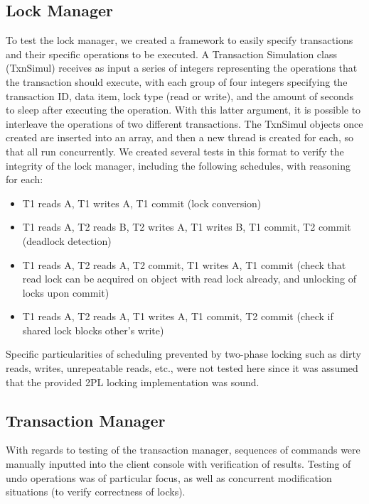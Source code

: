 \documentclass[11pt]{article}
\begin{document}
\subsection*{Lock Manager}

To test the lock manager, we created a framework to easily specify transactions and their specific operations to be executed. A Transaction Simulation class (TxnSimul) receives as input a series of integers representing the operations that the transaction should execute, with each group of four integers specifying the transaction ID, data item, lock type (read or write), and the amount of seconds to sleep after executing the operation. With this latter argument, it is possible to interleave the operations of two different transactions. The TxnSimul objects once created are inserted into an array, and then a new thread is created for each, so that all run concurrently. We created several tests in this format to verify the integrity of the lock manager, including the following schedules, with reasoning for each:

\begin{itemize}
\item T1 reads A, T1 writes A, T1 commit (lock conversion)
\item T1 reads A, T2 reads B, T2 writes A, T1 writes B, T1 commit, T2 commit (deadlock detection)
\item T1 reads A, T2 reads A, T2 commit, T1 writes A, T1 commit (check that read lock can be acquired on object with read lock already, and unlocking of locks upon commit)
\item T1 reads A, T2 reads A, T1 writes A, T1 commit, T2 commit (check if shared lock blocks other's write)
\end{itemize}

Specific particularities of scheduling prevented by two-phase locking such as dirty reads, writes, unrepeatable reads, etc., were not tested here since it was assumed that the provided 2PL locking implementation was sound. \par

\subsection*{Transaction Manager}

With regards to testing of the transaction manager, sequences of commands were manually inputted into the client console with verification of results. Testing of undo operations was of particular focus, as well as concurrent modification situations (to verify correctness of locks).\par
\end{document}
